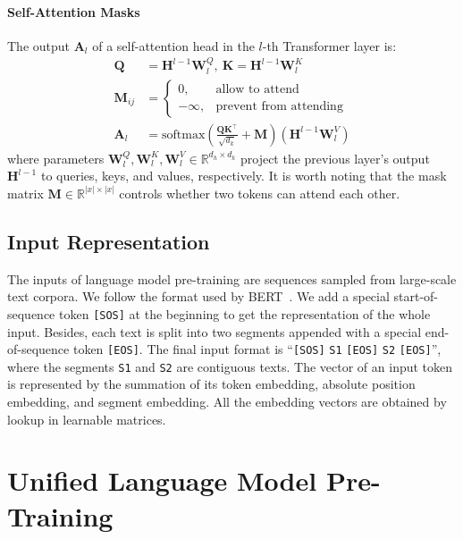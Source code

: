\documentclass{article}
\newcommand{\softmax}{\mathrm{softmax}}
\newcommand{\sptk}[1]{\texttt{[#1]}}
\begin{document}
\paragraph{Self-Attention Masks}

The output $\mathbf{A}_l$ of a self-attention head in the $l$-th Transformer layer is:
\begin{align}
\mathbf{Q} &= \mathbf{H}^{l-1} \mathbf{W}_l^Q,~\mathbf{K} = \mathbf{H}^{l-1} \mathbf{W}_l^K \nonumber \\
\mathbf{M}_{ij} &= \begin{cases} 0, &\text{allow to attend} \\ -\infty, &\text{prevent from attending} \end{cases} \label{eq:att:mask} \\
\mathbf{A}_l &= \softmax(\frac{\mathbf{Q} \mathbf{K}^{\intercal}}{ \sqrt{d_k}} + \mathbf{M}) (\mathbf{H}^{l-1} \mathbf{W}_l^V) \nonumber
\end{align}
where parameters $\mathbf{W}_l^Q , \mathbf{W}_l^K , \mathbf{W}_l^V \in \mathbb{R}^{d_h \times d_k}$ project the previous layer's output $\mathbf{H}^{l-1}$ to queries, keys, and values, respectively.
It is worth noting that the mask matrix $\mathbf{M} \in \mathbb{R}^{|x| \times |x|}$ controls whether two tokens can attend each other.


\subsection{Input Representation}
\label{sec:input}

The inputs of language model pre-training are sequences sampled from large-scale text corpora.
We follow the format used by BERT~\cite{bert}.
We add a special start-of-sequence token \sptk{SOS} at the beginning to get the representation of the whole input.
Besides, each text is split into two segments appended with a special end-of-sequence token \sptk{EOS}.
The final input format is ``\sptk{SOS} \texttt{S1} \sptk{EOS} \texttt{S2} \sptk{EOS}'', where the segments \texttt{S1} and \texttt{S2} are contiguous texts.
The vector of an input token is represented by the summation of its token embedding, absolute position embedding, and segment embedding.
All the embedding vectors are obtained by lookup in learnable matrices.


\section{Unified Language Model Pre-Training}
\end{document}

